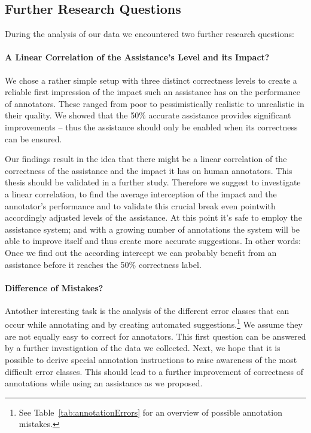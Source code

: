 	\subsection{Further Research Questions}
		During the analysis of our data we encountered two further research questions:

		\paragraph{A Linear Correlation of the Assistance's Level and its Impact?}
		We chose a rather simple setup with three distinct correctness levels to create a reliable first impression of the impact such an assistance has on the performance of annotators. These ranged from poor to pessimistically realistic to unrealistic in their quality. We showed that the 50\% accurate assistance provides significant improvements -- thus the assistance should only be enabled when its correctness can be ensured.

		Our findings result in the idea that there might be a linear correlation of the correctness of the assistance and the impact it has on human annotators. This thesis should be validated in a further study. Therefore we suggest to investigate a linear correlation, to find the average interception of the impact and the annotator's performance and to validate this crucial \lqq break even point\rqq with accordingly adjusted levels of the assistance. At this point it's safe to employ the assistance system; and with a growing number of annotations the system will be able to improve itself and thus create more accurate suggestions. In other words: Once we find out the according intercept we can probably benefit from an assistance before it reaches the 50\% correctness label.

		\paragraph{Difference of Mistakes?}
		\label{sec:discussFurtherResearch}
		Antother interesting task is the analysis of the different error classes that can occur while annotating and by creating automated suggestions.\footnote{See Table~\ref{tab:annotationErrors} for an overview of possible annotation mistakes.}
		We assume they are not equally easy to correct for annotators. This first question can be answered by a further investigation of the data we collected. Next, we hope that it is possible to derive special annotation instructions to raise awareness of the most difficult error classes. This should lead to a further improvement of correctness of annotations while using an assistance as we proposed.

